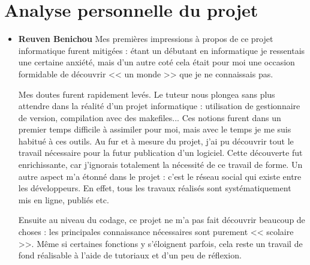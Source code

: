 \chapter{Analyse personnelle du projet}

\begin{itemize}
\item [\textbullet] \Large \textbf{Reuven Benichou}
\newline
\normalsize
Mes premi\`eres impressions \`a propos de ce projet informatique furent mitig\'ees : \'etant un d\'ebutant en informatique je ressentais une certaine anxi\'et\'e, mais d'un autre cot\'e cela \'etait pour moi une occasion formidable de d\'ecouvrir << un monde >> que je ne connaissais pas.

Mes doutes furent rapidement lev\'es. Le tuteur nous plongea sans plus attendre dans la r\'ealit\'e d'un projet informatique : utilisation de gestionnaire de version, compilation avec des makefiles...
Ces notions furent dans un premier temps difficile \`a assimiler pour moi, mais avec le temps je me suis habitu\'e \`a ces outils. Au fur et \`a mesure du projet,  j'ai pu d\'ecouvrir tout le travail n\'ecessaire pour la futur publication d'un logiciel. Cette d\'ecouverte fut enrichissante, car j'ignorais totalement la n\'ecessit\'e de ce travail de forme. Un autre aspect m'a \'etonn\'e dans le projet : c'est le r\'eseau social qui existe entre les d\'eveloppeurs. En effet, tous les travaux r\'ealis\'es sont syst\'ematiquement mis en ligne, publi\'es etc. 

Ensuite au niveau du codage, ce projet ne m'a pas fait d\'ecouvrir beaucoup de choses : les principales connaissance n\'ecessaires sont purement 
<< scolaire >>. Même si certaines fonctions y s'\'eloignent parfois, cela reste un travail de fond r\'ealisable \`a l'aide de tutoriaux et d'un peu de r\'eflexion.


\end{itemize}
